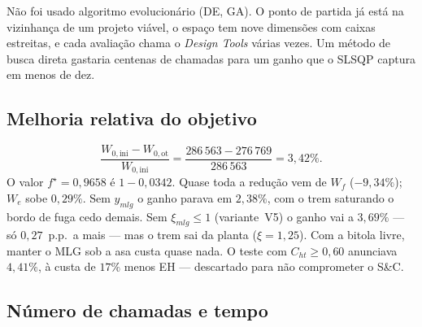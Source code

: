 Não foi usado algoritmo evolucionário (DE, GA). O ponto de partida já
está na vizinhança de um projeto viável, o espaço tem nove
dimensões com caixas estreitas, e cada avaliação chama o
\emph{Design Tools} várias vezes. Um método de busca direta gastaria
centenas de chamadas para um ganho que o SLSQP captura em menos de dez.

\subsection{Melhoria relativa do objetivo}
\label{sec:p3q5}

\begin{equation}
\frac{W_{0,\mathrm{ini}}-W_{0,\mathrm{ot}}}{W_{0,\mathrm{ini}}}
= \frac{286\,563-276\,769}{286\,563}
= 3{,}42\%.
\end{equation}
O valor $f^\star=0{,}9658$ é $1-0{,}0342$. Quase toda a redução vem
de $W_f$ ($-9{,}34\%$); $W_e$ sobe $0{,}29\%$. Sem $y_{mlg}$ o ganho
parava em $2{,}38\%$, com o trem saturando o bordo de fuga cedo demais.
Sem $\xi_{mlg}\le 1$ (variante~V5) o ganho vai a $3{,}69\%$ --- só
$0{,}27$~p.p.\ a mais --- mas o trem sai da planta ($\xi=1{,}25$). Com a
bitola livre, manter o MLG sob a asa custa quase nada. O teste com
$C_{ht}\ge 0{,}60$ anunciava $4{,}41\%$, à custa de $17\%$ menos EH ---
descartado para não comprometer o S\&C.

\subsection{Número de chamadas e tempo}
\label{sec:p3q6}

